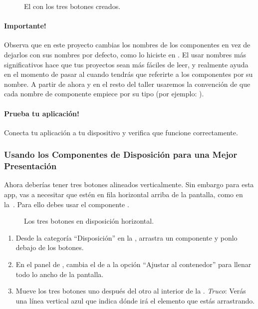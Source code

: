 \begin{figure}[H]
\centering
\caption{El \viewer con los tres botones creados.}
\label{fig:PaintPot1}
\end{figure}

\paragraph{Importante!}
Observa que en este proyecto cambias los nombres de los componentes en
vez de dejarlos con sus nombres por defecto, como lo hiciste en
. El usar nombres más significativos hace que tus
proyectos sean más fáciles de leer, y realmente ayuda en el momento de
pasar al \blockEditor cuando tendrás que referirte a los componentes
por su nombre. A partir de ahora y en el resto del taller usaremos la
convención de que cada nombre de componente empiece por su tipo (por
ejemplo: ).

\paragraph{Prueba tu aplicación!} Conecta tu aplicación a tu
dispositivo y verifica que funcione correctamente.

\subsubsection*{Usando los Componentes de Disposición para una Mejor
  Presentación}

Ahora deberías tener tres botones alineados verticalmente. Sin embargo
para esta app, vas a necesitar que estén en fila horizontal arriba de
la pantalla, como en la~. Para ello debes usar el
componente .

\begin{figure}[H]
\centering
\caption{Los tres botones en disposición horizontal.}
\label{fig:PaintPot2}
\end{figure}

\begin{enumerate}

\item Desde la categoría “Disposición'' en la \palette, arrastra un
  componente  y ponlo debajo de los
  botones.

\item En el panel de \properties, cambia el  de
   a la opción ``Ajustar al
  contenedor'' para llenar todo lo ancho de la pantalla.

\item Mueve los tres botones uno después del otro al interior de la
  . \emph{Truco}: Verás una línea
  vertical azul que indica dónde irá el elemento que estás
  arrastrando.

\end{enumerate}

